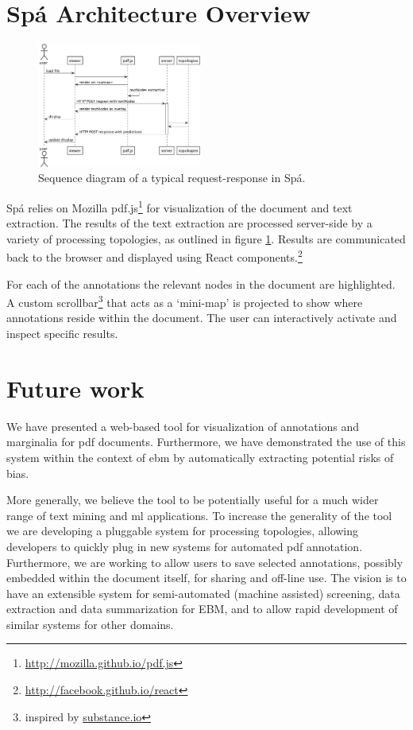 \documentclass[runningheads,a4paper]{llncs}
\begin{document}
\section{Spá Architecture Overview}

\label{section:architecture}
\begin{figure}
  \vspace{-1em}
  \includegraphics[width=0.48\textwidth]{./diagrams/sequence.pdf}
  \caption{\label{fig:sequence}Sequence diagram of a typical request-response in Spá.}
  \vspace{-1em}
\end{figure}

Spá relies on Mozilla pdf.js\footnote{\url{http://mozilla.github.io/pdf.js}} for visualization of the document and text extraction.
The results of the text extraction are processed server-side by a variety of processing topologies, as outlined in figure \ref{fig:sequence}.
Results are communicated back to the browser and displayed using React components.\footnote{\url{http://facebook.github.io/react}}

For each of the annotations the relevant nodes in the document are highlighted.
A custom scrollbar\footnote{inspired by \href{http://substance.io/}{substance.io}} that acts as a `mini-map' is projected to show where annotations reside within the document.
The user can interactively activate and inspect specific results.

\section{Future work}
We have presented a web-based tool for visualization of annotations and marginalia for \ac{pdf} documents.
Furthermore, we have demonstrated the use of this system within the context of \ac{ebm} by automatically extracting potential risks of bias.

More generally, we believe the tool to be potentially useful for a much wider range of text mining and \acl{ml} applications.
To increase the generality of the tool we are developing a pluggable system for processing topologies, allowing developers to quickly plug in new systems for automated \ac{pdf} annotation.
Furthermore, we are working to allow users to save selected annotations, possibly embedded within the document itself, for sharing and off-line use.
The vision is to have an extensible system for semi-automated (machine assisted) screening, data extraction and data summarization for EBM, and to allow rapid development of similar systems for other domains.
\end{document}
